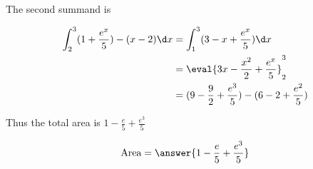 \documentclass{ximera}
\begin{document}
\begin{exercise}
\begin{hint}
	The second summand is

	\begin{align*}
		 \int_{2}^{3} (1+\frac{e^x}{5}) - (x-2) \d x &= \int_{1}^{3} (3-x+\frac{e^x}{5}) \d x\\
		&= \eval{3x-\frac{x^2}{2}+\frac{e^x}{5}}_2^3\\
		&= (9 - \frac{9}{2}+\frac{e^3}{5}) - (6-2+\frac{e^2}{5})
	\end{align*}

	Thus the total area is $1 - \frac{e}{5}+\frac{e^3}{5}$
\end{hint}

\begin{prompt}
	\[
		\textrm{Area} = \answer{1 - \frac{e}{5}+\frac{e^3}{5}}
	\]
\end{prompt}

\end{exercise}
\end{document}
